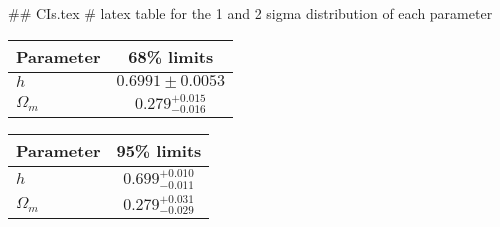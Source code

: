 ## CIs.tex
# latex table for the 1 and 2 sigma distribution of each parameter

\begin{tabular} { l  c}
 Parameter &  68\% limits\\
\hline
{\boldmath$h              $} & $0.6991\pm 0.0053          $\\
{\boldmath$\Omega_m       $} & $0.279^{+0.015}_{-0.016}   $\\
\hline
\end{tabular}

\begin{tabular} { l  c}
 Parameter &  95\% limits\\
\hline
{\boldmath$h              $} & $0.699^{+0.010}_{-0.011}   $\\
{\boldmath$\Omega_m       $} & $0.279^{+0.031}_{-0.029}   $\\
\hline
\end{tabular}
